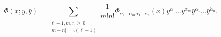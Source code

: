 \begin{equation}
\Phi(x;y,\bar y) = \sum_{
\begin{array}{c} \\[-7mm] \scriptstyle \ell+1, m, n  \, \ge \, 0 \\[-2mm]
                 \scriptstyle |m-n|=4(\ell+1) \end{array}} 
  \frac1{m!n!} 
  \Phi_{\alpha_1 \ldots \alpha_m \dot\alpha_1 \ldots \dot\alpha_n}(x)
  y^{\alpha_1} \ldots y^{\alpha_m} 
  \bar y^{\alpha_1} \ldots \bar y^{\dot\alpha_n}.
\end{equation}

